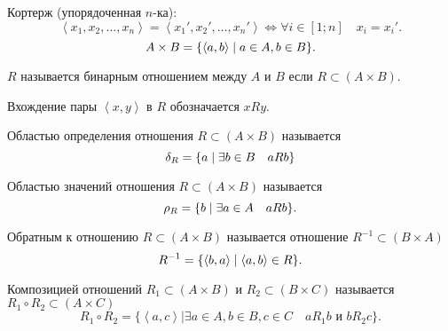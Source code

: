             Кортерж (упорядоченная $n$-ка):
            \[ \left<x_1, x_2, \ldots, x_n\right> = \left<x_1', x_2', \ldots, x_n'\right> \iff \forall{i\in \left[1; n\right]}\quad x_i = x_i' .\] 
            \[ A \times B = \{\left<a, b\right> \mid a\in A, b\in B\}  .\]
    \pagebreak
    \begin{definition} 
        $R$ называется бинарным отношением между $A$ и $B$ если $R \subset \left( A \times B \right) $.

        Вхождение пары $\left<x,y\right>$ в $R$ обозначается $xRy$.
    \end{definition}
    \begin{definition} 
        Областью определения отношения $R \subset \left( A \times B \right) $ называется 
        \[\delta_{R} = \{a \mid \exists{b\in B}\quad aRb\}\]
    \end{definition}
    \begin{definition} 
        Областью значений отношения $R \subset \left( A \times B \right) $ называется
        \[ \rho_{R} = \{b \mid \exists{a\in A}\quad aRb\}  .\] 
    \end{definition}
    \begin{definition}  
        Обратным к отношению $R \subset \left( A \times B \right) $ называется отношение $R^{-1} \subset \left( B \times A \right) $
        \[ R^{-1} = \{\left<b, a\right> \mid \left<a, b\right>\in R\}  .\] 
    \end{definition}
    \begin{definition} 
        Композицией отношений $R_1 \subset \left( A \times B \right) $ и $R_2 \subset \left( B \times C \right) $ называется $R_1 \circ R_2 \subset \left( A \times C \right) $
        \[ R_1 \circ R_2 = \{\left<a, c\right> | \exists{a\in A, b\in B, c\in C}\quad aR_1b \text{ и } bR_2c \}  .\] 
    \end{definition}
